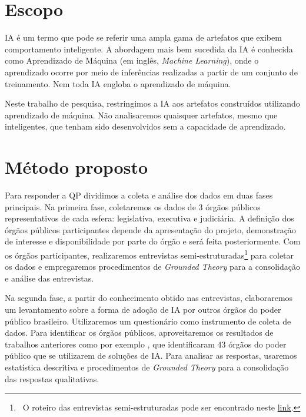 \documentclass[12pt]{article}
\begin{document}

\section{Escopo}
IA é um termo que pode se referir uma ampla gama de artefatos que exibem comportamento inteligente. A abordagem mais bem sucedida da IA é conhecida como Aprendizado de Máquina (em inglês, \textit{Machine Learning}), onde o aprendizado ocorre por meio de inferências realizadas a partir de um conjunto de treinamento. Nem toda IA engloba o aprendizado de máquina.

Neste trabalho de pesquisa, restringimos a IA aos artefatos construídos utilizando aprendizado de máquina. Não analisaremos quaisquer artefatos, mesmo que inteligentes, que tenham sido desenvolvidos sem a capacidade de aprendizado.



\section{Método proposto}

Para responder a QP dividimos a coleta e análise dos dados em duas fases principais. Na primeira fase, coletaremos os dados de 3 órgãos públicos representativos de cada esfera: legislativa, executiva e judiciária. A definição dos órgãos públicos participantes depende da apresentação do projeto, demonstração de interesse e disponibilidade por parte do órgão e será feita posteriormente. Com os órgãos participantes, realizaremos entrevistas semi-estruturadas\footnote{~O roteiro das entrevistas semi-estruturadas pode ser encontrado neste \href{https://docs.google.com/document/d/1XO1mXbrIS49Nu2WjoxDkit6h-gZgGcsmll_4swI0RjU/edit?usp=sharing}{link}.} para coletar os dados e empregaremos procedimentos de \textit{Grounded Theory} \cite{Char06} para a consolidação e análise das entrevistas.

Na segunda fase, a partir do conhecimento obtido nas entrevistas, elaboraremos um levantamento sobre a forma de adoção de IA por outros órgãos do poder público brasileiro. Utilizaremos um questionário como instrumento de coleta de dados. Para identificar os órgãos públicos, aproveitaremos os resultados de trabalhos anteriores como por exemplo \cite{SBG2020}, que identificaram 43 órgãos do poder público que se utilizarem de soluções de IA. Para analisar as respostas, usaremos estatística descritiva e procedimentos de \textit{Grounded Theory} \cite{Char06} para a consolidação das respostas qualitativas.
\end{document}
